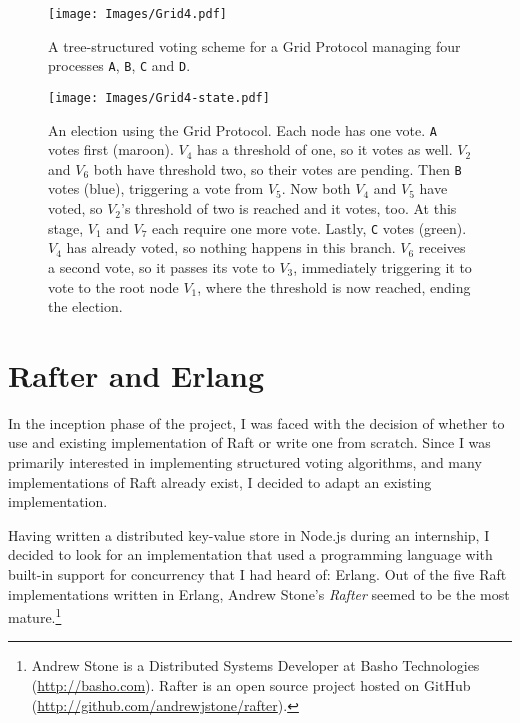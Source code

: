 \documentclass[11pt,chapterprefix=true,toc=bibliography,numbers=noendperiod,
               footnotes=multiple,twoside]{scrreprt}
\begin{document}
\begin{figure}[h]
    \centering
    \texttt{[image: Images/Grid4.pdf]}
    \caption[Tree-structured voting scheme for a Grid Protocol]{A tree-structured voting scheme for a Grid Protocol managing four processes \texttt{A}, \texttt{B}, \texttt{C} and \texttt{D}.}
    \label{fig:grid4}
\end{figure}

\begin{figure}[p]
    \centering
    \texttt{[image: Images/Grid4-state.pdf]}
    \caption[An election using the Grid Protocol]{An election using the Grid Protocol. Each node has one vote. \texttt{A} votes first (maroon). \(V_4\) has a threshold of one, so it votes as well. \(V_2\) and \(V_6\) both have threshold two, so their votes are pending. Then \texttt{B} votes (blue), triggering a vote from \(V_5\). Now both \(V_4\) and \(V_5\) have voted, so \(V_2\)'s threshold of two is reached and it votes, too. At this stage, \(V_1\) and \(V_7\) each require one more vote. Lastly, \texttt{C} votes (green). \(V_4\) has already voted, so nothing happens in this branch. \(V_6\) receives a second vote, so it passes its vote to \(V_3\), immediately triggering it to vote to the root node \(V_1\), where the threshold is now reached, ending the election.}
    \label{fig:grid4-state}
\end{figure}

\section{Rafter and Erlang}

In the inception phase of the project, I was faced with the decision of whether to use and existing implementation of Raft or write one from scratch. Since I was primarily interested in implementing structured voting algorithms, and many implementations of Raft already exist, I decided to adapt an existing implementation.

Having written a distributed key-value store in Node.js during an internship, I decided to look for an implementation that used a programming language with built-in support for concurrency that I had heard of: Erlang. Out of the five Raft implementations written in Erlang, Andrew Stone's \emph{Rafter} seemed to be the most mature.\footnote{Andrew Stone is a Distributed Systems Developer at Basho Technologies (\url{http://basho.com}). Rafter is an open source project hosted on GitHub (\url{http://github.com/andrewjstone/rafter}).}
\end{document}

